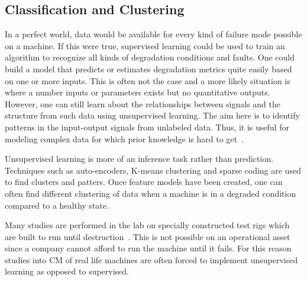 \documentclass[]{article}
\begin{document}
\subsection{Classification and Clustering}
In a perfect world, data would be available for every kind of failure mode possible on a machine. If this were true, supervised learning could be used to train an algorithm to recognize all kinds of degradation conditions and faults. One could build a model that predicts or estimates degradation metrics quite easily based on one or more inputs. This is often not the case and a more likely situation is where a number inputs or parameters exists but no quantitative outputs. However, one can still learn about the relationships between signals and the structure from such data using unsupervised learning. The aim here is to identify patterns in the input-output signals from unlabeled data. Thus, it is useful for modeling complex data for which prior knowledge is hard to get~\cite{martin2017unsupervised}.

Unsupervised learning is more of an inference task rather than prediction. Techniques such as auto-encoders, K-means clustering and sparse coding are used to find clusters and patters. Once feature models have been created, one can often find different clustering of data when a machine is in a degraded condition compared to a healthy state.

Many studies are performed in the lab on specially constructed test rigs which are built to run until destruction~\cite{soualhi2021novel, wang2016multiple, d2019physical, malhi2004pca}. This is not possible on an operational asset since a company cannot afford to run the machine until it fails. For this reason studies into \gls{CM} of real life machines are often forced to implement unsupervised learning as opposed to supervised.
\end{document}
